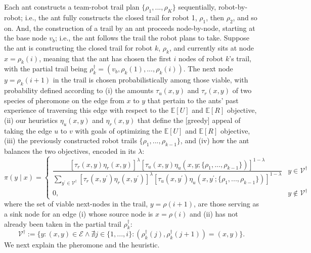\documentclass[11pt, oneside]{article}
\begin{document}
Each ant constructs a team-robot trail plan $\{\rho_1, ..., \rho_K\}$ sequentially, robot-by-robot; i.e., the ant fully constructs the closed trail for robot 1, $\rho_1$, then $\rho_2$, and so on. And, the construction of a trail by an ant proceeds node-by-node, starting at the base node $v_b$; i.e., the ant follows the trail the robot plans to take. Suppose the ant is constructing the closed trail for robot $k$, $\rho_k$, and currently sits at node $x=\rho_k(i)$, meaning that the ant has chosen the first $i$ nodes of robot $k$'s trail, with the partial trail being $\rho_k^\dagger=(v_b, \rho_k(1), ..., \rho_k(i))$. 
The next node $y=\rho_k(i+1)$ in the trail is chosen probabilistically among those viable, with probability defined according to (i) the amounts $\tau_u(x, y)$ and $\tau_r(x, y)$ of two species of pheromone on the edge from $x$ to $y$ that pertain to the ants' past experience of traversing this edge with respect to the $\mathbb{E}[U]$ and $\mathbb{E}[R]$ objective, (ii) our heuristics $\eta_u(x, y)$ and $\eta_r(x, y)$  that define the [greedy] appeal of taking the edge $u$ to $v$ with goals of optimizing the $\mathbb{E}[U]$ and $\mathbb{E}[R]$ objective, (iii) the previously constructed robot trails $\{\rho_1, ..., \rho_{k-1}\}$, and (iv) how the ant balances the two objectives, encoded in its $\lambda$:
\begin{equation}
	\pi(y \mid x) = 
	\begin{cases}
		\dfrac{
		 \left[\tau_r(x, y) \eta_r(x, y) \right]^\lambda \left[ \tau_u(x, y) \eta_u(x, y; \{\rho_1, ..., \rho_{k-1}\}) \right]^{1-\lambda} }{
		 \sum_{y^\prime \in \mathcal{V}^\dagger} \left[\tau_r(x, y^\prime) \eta_r(x, y^\prime) \right]^\lambda \left[ \tau_u(x, y^\prime) \eta_u(x, y^\prime; \{\rho_1, ..., \rho_{k-1}\}) \right]^{1-\lambda} 
		 }
		 &
		 y \in \mathcal{V}^\dagger
		  \\
		 0, & y \notin \mathcal{V}^\dagger
	\end{cases} \label{eq:prob_x_y}
\end{equation} where the set of viable next-nodes in the trail, $y=\rho(i+1)$, are those serving as a sink node for an edge (i) whose source node is $x=\rho(i)$ and (ii) has not already been taken in the partial trail $\rho_k^\dagger$:
\begin{equation}
 	\mathcal{V}^\dagger := \{ y : (x, y) \in \mathcal{E} \land \nexists j \in \{1, ..., i\} : (\rho_k^\dagger(j), \rho_k^\dagger(j+1))= (x, y)  \}.
\end{equation}
We next explain the pheromone and the heuristic.
\end{document}
